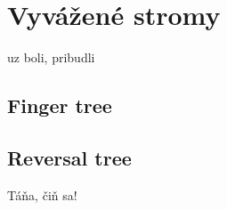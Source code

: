 \section{Vyvážené stromy}

uz boli, pribudli 
\subsection{Finger tree}
\subsection{Reversal tree}
Táňa, čiň sa! 